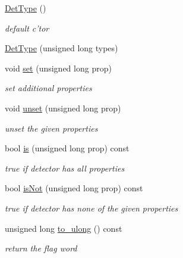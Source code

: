 \begin{DoxyCompactItemize}
\item 
\hyperlink{class_d_d4hep_1_1_det_type_afd9299bbb49ac7016d966fb94ad090c8}{DetType} ()
\begin{DoxyCompactList}\small\item\em default c'tor \item\end{DoxyCompactList}\item 
\hyperlink{class_d_d4hep_1_1_det_type_a4d20c3eee13d6a2e8856fea8e266e36b}{DetType} (unsigned long types)
\item 
void \hyperlink{class_d_d4hep_1_1_det_type_ada4a0d1afa3bfa7e8d135b52af921dd3}{set} (unsigned long prop)
\begin{DoxyCompactList}\small\item\em set additional properties \item\end{DoxyCompactList}\item 
void \hyperlink{class_d_d4hep_1_1_det_type_aad9477be2d3a9a23cb1edb0d2435ad31}{unset} (unsigned long prop)
\begin{DoxyCompactList}\small\item\em unset the given properties \item\end{DoxyCompactList}\item 
bool \hyperlink{class_d_d4hep_1_1_det_type_afa3e3d456652cb900e14ade69590c5b0}{is} (unsigned long prop) const 
\begin{DoxyCompactList}\small\item\em true if detector has all properties \item\end{DoxyCompactList}\item 
bool \hyperlink{class_d_d4hep_1_1_det_type_a63b12afcb031ac39996c6dbd7481ff11}{isNot} (unsigned long prop) const 
\begin{DoxyCompactList}\small\item\em true if detector has none of the given properties \item\end{DoxyCompactList}\item 
unsigned long \hyperlink{class_d_d4hep_1_1_det_type_afbd853fb8619a470e3d649e20630eca4}{to\_\-ulong} () const 
\begin{DoxyCompactList}\small\item\em return the flag word \item\end{DoxyCompactList}\end{DoxyCompactItemize}
